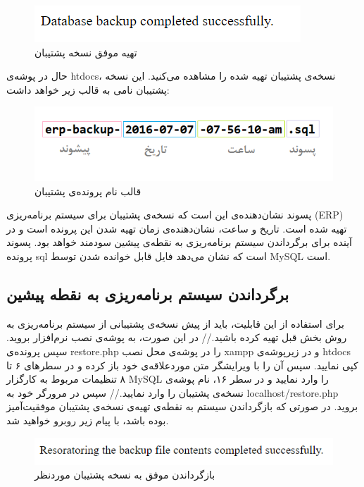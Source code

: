 \begin{figure}[H]
	\centering
	\includegraphics[scale=0.7]{img/manual/backup}
	\caption{تهیه موفق نسخه پشتیبان}
\end{figure}

حال در پوشه‌ی htdocs، نسخه‌ی پشتیبان تهیه شده را مشاهده می‌کنید. این نسخه پشتیبان نامی به قالب زیر خواهد داشت:

\begin{figure}[H]
	\centering
	\includegraphics[scale=0.7]{img/manual/name}
	\caption{قالب نام پرونده‌ی پشتیبان}
\end{figure}

پسوند نشان‌دهنده‌ی این است که نسخه‌ی پشتیبان برای سیستم برنامه‌ریزی (ERP) تهیه شده است. تاریخ و ساعت، نشان‌دهنده‌ی زمان تهیه شدن این پرونده است و در آینده برای برگرداندن سیستم برنامه‌ریزی به نقطه‌ی پیشین سودمند خواهد بود. پسوند پرونده sql است که نشان می‌دهد فایل قابل خوانده شدن توسط MySQL است.

\subsection{برگرداندن سیستم برنامه‌ریزی به نقطه پیشین}
برای استفاده از این قابلیت، باید از پیش نسخه‌ی پشتیبانی از سیستم برنامه‌ریزی به روش بخش قبل تهیه کرده باشید.//
در این صورت، به پوشه‌ی نصب نرم‌افزار بروید. سپس پرونده‌ی restore.php را در پوشه‌ی محل نصب xampp و در زیرپوشه‌ی htdocs کپی نمایید. سپس آن را با ویرایشگر متن موردعلاقه‌ی خود باز کرده و در سطرهای ۶ تا ۸ تنظیمات مربوط به کارگزار MySQL را وارد نمایید و در سطر ۱۶،  نام پوشه‌ی نسخه‌ی پشتیبان را وارد نمایید.//
سپس در مرورگر خود به  localhost/restore.php بروید. در صورتی که  بازگرداندن سیستم به نقطه‌ی تهیه‌ی نسخه‌ی پشتیبان موفقیت‌آمیز بوده باشد، با پیام زیر روبرو خواهید شد.
\begin{figure}[H]
	\centering
	\includegraphics[scale=0.7]{img/manual/restore}
	\caption{بازگرداندن موفق به نسخه پشتیبان موردنظر}
\end{figure}



